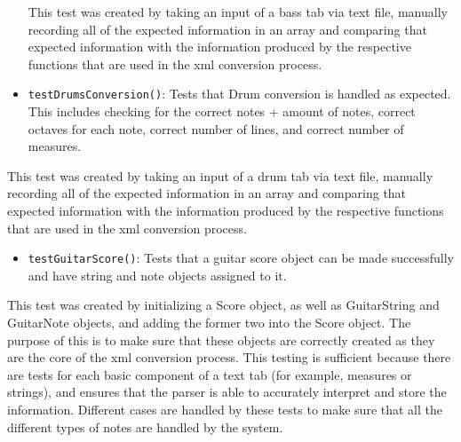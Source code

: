 \documentclass[11pt]{article}
\begin{document}
\begin{itemize}
This test was created by taking an input of a bass tab via text file, manually recording all of the expected information in an array and comparing that expected information with the information produced by the respective functions that are used in the xml conversion process.
\item \texttt{testDrumsConversion()}: Tests that Drum conversion is handled as expected. This includes checking for the correct notes + amount of notes, correct octaves for each note, correct number of lines, and correct number of measures.
\end{itemize}
This test was created by taking an input of a drum tab via text file, manually recording all of the expected information in an array and comparing that expected information with the information produced by the respective functions that are used in the xml conversion process.
\begin{itemize}
\item \texttt{testGuitarScore()}: Tests that a guitar score object can be made successfully and have string and note objects assigned to it.
\end{itemize}
This test was created by initializing a Score object, as well as GuitarString and GuitarNote objects, and adding the former two into the Score object. The purpose of this is to make sure that these objects are correctly created as they are the core of the xml conversion process.
This testing is sufficient because there are tests for each basic component of a text tab (for example, measures or strings), and ensures that the parser is able to accurately interpret and store the information. Different cases are handled by these tests to make sure that all the different types of notes are handled by the system.
\end{document}

